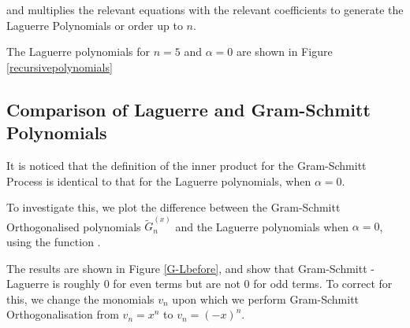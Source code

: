 \documentclass{article}
\begin{document}
and multiplies the relevant equations with the relevant coefficients to generate the Laguerre Polynomials or order up to $ n $.

The Laguerre polynomials for $n = 5$ and $\alpha = 0$ are shown in Figure \ref{recursivepolynomials}
















\subsection{Comparison of Laguerre and Gram-Schmitt Polynomials}

It is noticed that the definition of the inner product for the Gram-Schmitt Process is identical to that for the Laguerre polynomials, when $\alpha = 0$. 

To investigate this, we plot the difference between the Gram-Schmitt Orthogonalised polynomials $\tilde{G}_n^{(x)} $ and the Laguerre polynomials when $\alpha = 0$, using the function . 

The results are shown in Figure \ref{G-Lbefore}, and show that Gram-Schmitt - Laguerre is roughly $0$ for even terms but are not $0$ for odd terms. To correct for this, we change the monomials $v_n$ upon which we perform Gram-Schmitt Orthogonalisation from $v_n = x^n$ to $v_n = (-x)^n$. 
\end{document}
